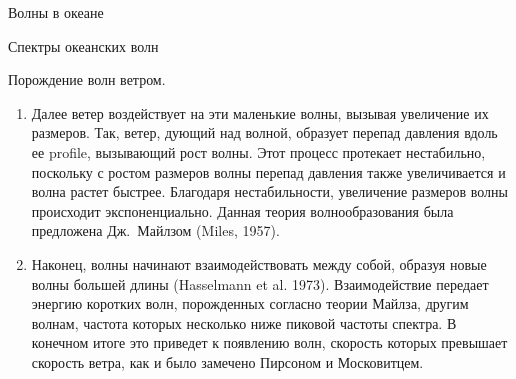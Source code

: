 \begin{chapter}{Волны в океане}
\begin{section}{Спектры океанских волн}
\begin{paragraph}{Порождение волн ветром.}
\begin{enumerate}
\item 
Далее ветер воздействует на эти маленькие волны, вызывая увеличение их 
размеров. Так, ветер, дующий над волной, образует перепад давления вдоль
ее profile, вызывающий рост волны. Этот процесс протекает нестабильно, 
поскольку с ростом размеров волны перепад давления также увеличивается и волна
растет быстрее. Благодаря нестабильности, увеличение размеров волны
происходит экспоненциально. 
Данная теория волнообразования была предложена Дж.~Майлзом (Miles, 1957).
%

\item
Наконец, волны начинают взаимодействовать между собой, образуя новые волны
большей длины (Hasselmann et al. 1973). Взаимодействие передает энергию
коротких волн, порожденных согласно теории Майлза, другим волнам, частота
которых несколько ниже пиковой частоты спектра. В конечном итоге это приведет
к появлению волн, скорость которых превышает скорость ветра, как и было
замечено Пирсоном и Московитцем.
%
\end{enumerate}
\end{paragraph}
\end{section}


\end{chapter}
